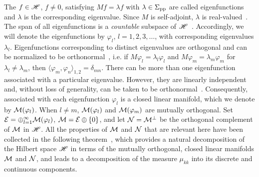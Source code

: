 \documentclass[amsa]{ipart}
\begin{document}
 The $f\in\mathscr{H}$, $f\neq0$, satisfying $Mf=\lambda
f$ with $\lambda\in\Sigma_{\text{pp}}$ are called eigenfunctions and $\lambda$ is the
corresponding eigenvalue. Since $M$ is self-adjoint, $\lambda$ is
real-valued~\cite{Stone:64}. The
span of all eigenfunctions is a \emph{countable} subspace of
$\mathscr{H}$~\cite{Stone:64}. Accordingly, we will denote the
eigenfunctions by $\varphi_l$, $l=1,2,3,\ldots$, with corresponding eigenvalues
$\lambda_l$. Eigenfunctions corresponding to distinct eigenvalues
are orthogonal and can be normalized to be
orthonormal~\cite{Stone:64}, i.e. if $M\varphi_l=\lambda_l\varphi_l$ and $M\varphi_m=\lambda_m\varphi_m$
for $\lambda_l\neq\lambda_m$, then $\langle\varphi_m,\varphi_n\rangle_{1,2}=\delta_{mn}$.
There can be more than one eigenfunction associated with a particular
eigenvalue. However, they are linearly independent
and, without loss of generality, can be taken to be
orthonormal~\cite{Stone:64}. Consequently, associated with each
eigenfunction $\varphi_l$ is a closed linear manifold, which we denote by
$\mathcal{M}(\varphi_l)$. When $l\neq m$, $\mathcal{M}(\varphi_l)$ and $\mathcal{M}(\varphi_m)$ are mutually 
orthogonal. Set $\mathcal{E}=\oplus_{l=1}^\infty\mathcal{M}(\varphi_l)$, $\mathcal{M}=\mathcal{E}\oplus\{0\}$, and let
$\mathcal{N}=\mathcal{M}^\perp$ be the orthogonal complement of $\mathcal{M}$ in $\mathscr{H}$. All the
properties of $\mathcal{M}$ and $\mathcal{N}$ that are relevant here have been
collected in the following theorem~\cite{Stone:64}, which provides a
natural decomposition of the Hilbert space $\mathscr{H}$ in terms of the
mutually orthogonal, closed linear manifolds $\mathcal{M}$ and $\mathcal{N}$, and
leads to a decomposition of the measure $\mu_{kk}$ into its discrete and
continuous components. 
%
\end{document}
